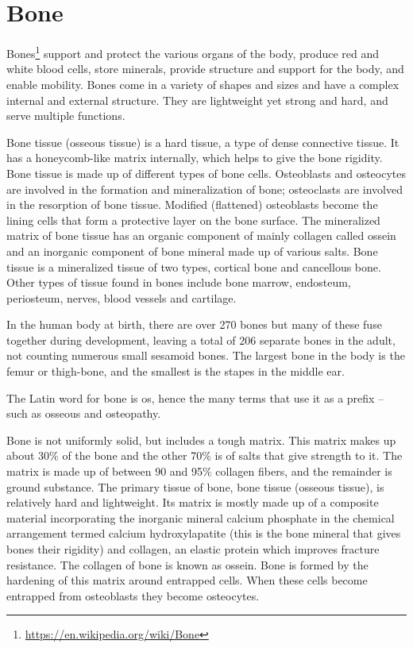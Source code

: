 \documentclass[]{book}
\let\rmarkdownfootnote\footnote%
\def\footnote{\protect\rmarkdownfootnote}
\renewcommand{\href}[2]{#2\footnote{\url{#1}}}
\begin{document}
\hypertarget{bone}{%
\section{Bone}\label{bone}}

\href{https://en.wikipedia.org/wiki/Bone}{Bones} support and protect the various organs of the body, produce red and white blood cells, store minerals, provide structure and support for the body, and enable mobility. Bones come in a variety of shapes and sizes and have a complex internal and external structure. They are lightweight yet strong and hard, and serve multiple functions.

Bone tissue (osseous tissue) is a hard tissue, a type of dense connective tissue. It has a honeycomb-like matrix internally, which helps to give the bone rigidity. Bone tissue is made up of different types of bone cells. Osteoblasts and osteocytes are involved in the formation and mineralization of bone; osteoclasts are involved in the resorption of bone tissue. Modified (flattened) osteoblasts become the lining cells that form a protective layer on the bone surface. The mineralized matrix of bone tissue has an organic component of mainly collagen called ossein and an inorganic component of bone mineral made up of various salts. Bone tissue is a mineralized tissue of two types, cortical bone and cancellous bone. Other types of tissue found in bones include bone marrow, endosteum, periosteum, nerves, blood vessels and cartilage.

In the human body at birth, there are over 270 bones but many of these fuse together during development, leaving a total of 206 separate bones in the adult, not counting numerous small sesamoid bones. The largest bone in the body is the femur or thigh-bone, and the smallest is the stapes in the middle ear.

The Latin word for bone is os, hence the many terms that use it as a prefix -- such as osseous and osteopathy.

Bone is not uniformly solid, but includes a tough matrix. This matrix makes up about 30\% of the bone and the other 70\% is of salts that give strength to it. The matrix is made up of between 90 and 95\% collagen fibers, and the remainder is ground substance. The primary tissue of bone, bone tissue (osseous tissue), is relatively hard and lightweight. Its matrix is mostly made up of a composite material incorporating the inorganic mineral calcium phosphate in the chemical arrangement termed calcium hydroxylapatite (this is the bone mineral that gives bones their rigidity) and collagen, an elastic protein which improves fracture resistance. The collagen of bone is known as ossein. Bone is formed by the hardening of this matrix around entrapped cells. When these cells become entrapped from osteoblasts they become osteocytes.
\end{document}
